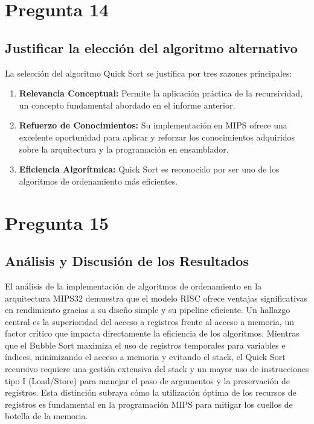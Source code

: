 \documentclass{article}
\begin{document}
\section*{Pregunta 14}
\subsection*{Justificar la elección del algoritmo alternativo}

La selección del algoritmo Quick Sort se justifica por tres razones principales:

\begin{enumerate}
\item \textbf{Relevancia Conceptual:} Permite la aplicación práctica de la recursividad, un concepto fundamental abordado en el informe anterior.
\item \textbf{Refuerzo de Conocimientos:} Su implementación en MIPS ofrece una excelente oportunidad para aplicar y reforzar los conocimientos adquiridos sobre la arquitectura y la programación en ensamblador.
\item \textbf{Eficiencia Algorítmica:} Quick Sort es reconocido por ser uno de los algoritmos de ordenamiento más eficientes.
\end{enumerate}

\section*{Pregunta 15}
\subsection*{Análisis y Discusión de los Resultados}
El análisis de la implementación de algoritmos de ordenamiento en la arquitectura MIPS32 demuestra que el modelo RISC ofrece ventajas significativas en rendimiento gracias a su diseño simple y su pipeline eficiente. Un hallazgo central es la superioridad del acceso a registros frente al acceso a memoria, un factor crítico que impacta directamente la eficiencia de los algoritmos. Mientras que el Bubble Sort maximiza el uso de registros temporales para variables e índices, minimizando el acceso a memoria y evitando el stack, el Quick Sort recursivo requiere una gestión extensiva del stack y un mayor uso de instrucciones tipo I (Load/Store) para manejar el paso de argumentos y la preservación de registros. Esta distinción subraya cómo la utilización óptima de los recursos de registros es fundamental en la programación MIPS para mitigar los cuellos de botella de la memoria.
\end{document}
